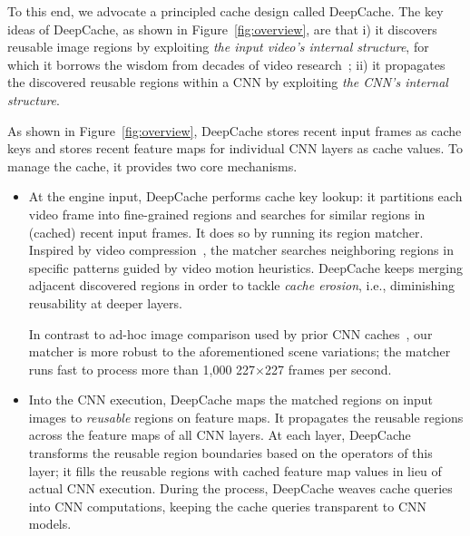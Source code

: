 \documentclass[10pt,acmtog]{acmart}
\newcommand{\framework}{DeepCache\xspace}
\newcommand{\sys}{\framework{}}
\newcommand{\variation}{scene variations\xspace}
\begin{document}
To this end, we advocate a principled cache design called \framework. 
The key ideas of \sys{}, as shown in Figure~\ref{fig:overview}, are that i) it discovers reusable image regions by exploiting \textit{the input video's internal structure}, for which it borrows the wisdom from decades of video research~\cite{tham1998novel,zhu1997new,barjatya2004block}; 
ii) it propagates the discovered reusable regions within a CNN by exploiting \textit{the CNN's internal structure}.

As shown in Figure~\ref{fig:overview},
\sys{} stores recent input frames as cache keys and stores recent feature maps for individual CNN layers as cache values. 
To manage the cache, it provides two core mechanisms.
\begin{itemize}
\item 
At the engine input, \sys{} performs cache key lookup: it partitions each video frame into fine-grained regions and searches for similar regions in (cached) recent input frames. 
It does so by running its region matcher. 
Inspired by video compression~\cite{zhu1997new}, the matcher searches neighboring regions in specific patterns guided by video motion heuristics.
\sys{} keeps merging adjacent discovered regions in order to tackle \textit{cache erosion}, i.e., diminishing reusability at deeper layers. 

In contrast to ad-hoc image comparison used by prior CNN caches~\cite{conf/mobisys/LocLB17,cavigelli2017cbinfer}, our matcher is more robust to the aforementioned \variation; 
the matcher runs fast to process more than 1,000 227$\times$227 frames per second.



\item 
Into the CNN execution, \sys{} maps the matched regions on input images to \textit{reusable} regions on feature maps.
It propagates the reusable regions across the feature maps of all CNN layers. 
At each layer, \sys{} transforms the reusable region boundaries based on the operators of this layer; 
it fills the reusable regions with cached feature map values in lieu of actual CNN execution. 
During the process, \sys{} weaves cache queries into CNN computations, keeping the cache queries transparent to CNN models. 


\end{itemize}
\end{document}
